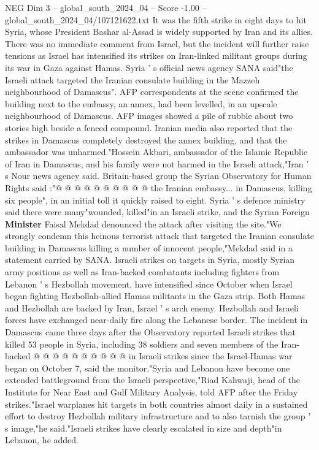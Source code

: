 \begin{textsample}{NEG Dim 3 – global\_south\_2024\_04 – Score -1.00 – global\_south\_2024\_04/107121622.txt}  \label{ex:f3_neg_242}
It was the fifth strike in eight days to hit Syria, whose President Bashar al-Assad is widely supported by Iran and its allies.
There was no immediate comment from Israel, but the incident will further raise tensions as Israel has intensified its strikes on Iran-linked militant groups during its war in Gaza against Hamas.
Syria ' s official news agency SANA said"the Israeli attack targeted the Iranian consulate building in the Mazzeh neighbourhood of Damascus".
AFP correspondents at the scene confirmed the building next to the embassy, an annex, had been levelled, in an upscale neighbourhood of Damascus.
AFP images showed a pile of rubble about two stories high beside a fenced compound.
Iranian media also reported that the strikes in Damascus completely destroyed the annex building, and that the ambassador was unharmed."Hossein Akbari, ambassador of the Islamic Republic of Iran in Damascus, and his family were not harmed in the Israeli attack,"Iran ' s Nour news agency said.
Britain-based group the Syrian Observatory for Human Rights said :"@ @ @ @ @ @ @ @ @ @ the Iranian embassy... in Damascus, killing six people", in an initial toll it quickly raised to eight.
Syria ' s defence ministry said there were many"wounded, killed"in an Israeli strike, and the Syrian Foreign \textbf{Minister} Faisal Mekdad denounced the attack after visiting the site."We strongly condemn this heinous terrorist attack that targeted the Iranian consulate building in Damascus killing a number of innocent people,"Mekdad said in a statement carried by SANA.
Israeli strikes on targets in Syria, mostly Syrian army positions as well as Iran-backed combatants including fighters from Lebanon ' s Hezbollah movement, have intensified since October when Israel began fighting Hezbollah-allied Hamas militants in the Gaza strip.
Both Hamas and Hezbollah are backed by Iran, Israel ' s arch enemy.
Hezbollah and Israeli forces have exchanged near-daily fire along the Lebanese border.
The incident in Damascus came three days after the Observatory reported Israeli strikes that killed 53 people in Syria, including 38 soldiers and seven members of the Iran-backed @ @ @ @ @ @ @ @ @ @ in Israeli strikes since the Israel-Hamas war began on October 7, said the monitor."Syria and Lebanon have become one extended battleground from the Israeli perspective,"Riad Kahwaji, head of the Institute for Near East and Gulf Military Analysis, told AFP after the Friday strikes."Israel warplanes hit targets in both countries almost daily in a sustained effort to destroy Hezbollah military infrastructure and to also tarnish the group ' s image,"he said."Israeli strikes have clearly escalated in size and depth"in Lebanon, he added.

\end{textsample}

